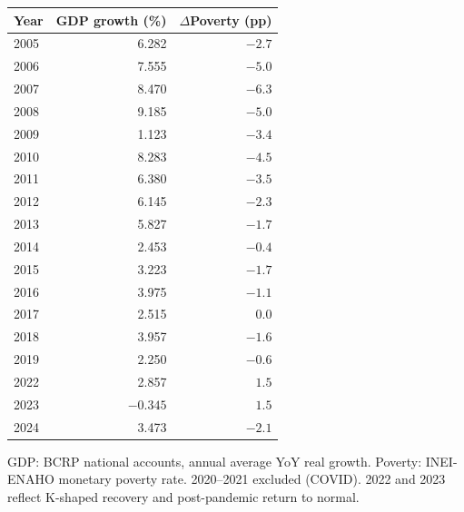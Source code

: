 
\begin{tabular}{lrr}
\toprule
Year & GDP growth (\%) & $\Delta$Poverty (pp) \\
\midrule
    2005 & 6.282 & $-2.7$ \\
    2006 & 7.555 & $-5.0$ \\
    2007 & 8.470 & $-6.3$ \\
    2008 & 9.185 & $-5.0$ \\
    2009 & 1.123 & $-3.4$ \\
    2010 & 8.283 & $-4.5$ \\
    2011 & 6.380 & $-3.5$ \\
    2012 & 6.145 & $-2.3$ \\
    2013 & 5.827 & $-1.7$ \\
    2014 & 2.453 & $-0.4$ \\
    2015 & 3.223 & $-1.7$ \\
    2016 & 3.975 & $-1.1$ \\
    2017 & 2.515 & $\phantom{-}0.0$ \\
    2018 & 3.957 & $-1.6$ \\
    2019 & 2.250 & $-0.6$ \\
    2022 & 2.857 & $1.5$ \\
    2023 & $-0.345$ & $1.5$ \\
    2024 & 3.473 & $-2.1$ \\
\bottomrule
\end{tabular}
\begin{tablenotes}
\small GDP: BCRP national accounts, annual average YoY real growth.
Poverty: INEI-ENAHO monetary poverty rate. 2020--2021 excluded (COVID).
2022 and 2023 reflect K-shaped recovery and post-pandemic return to normal.
\end{tablenotes}

